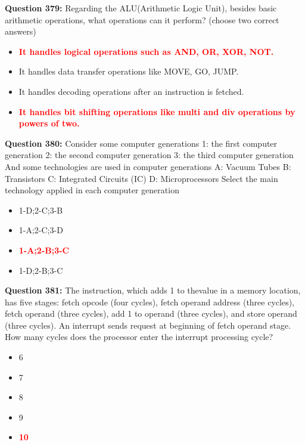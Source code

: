 \documentclass[12pt,a4paper]{article}
\begin{document}
\vspace{0.5cm}

\textbf{Question 379:} Regarding the ALU(Arithmetic Logic Unit), besides basic arithmetic operations, what operations can it perform? (choose two correct answers)

\begin{itemize}
    \item[\textbf{A.}] \textcolor{red}{\textbf{It handles logical operations such as AND, OR, XOR, NOT.}}
    \item[\textbf{B.}] It handles data transfer operations like MOVE, GO, JUMP.
    \item[\textbf{C.}] It handles decoding operations after an instruction is fetched.
    \item[\textbf{D.}] \textcolor{red}{\textbf{It handles bit shifting operations like multi and div operations by powers of two.}}
\end{itemize}

\vspace{0.5cm}

\textbf{Question 380:} Consider some computer generations 1: the first computer generation 2: the second computer generation 3: the third computer generation And some technologies are used in computer generations A: Vacuum Tubes B: Transistors C: Integrated Circuits (IC) D: Microprocessors Select the main technology applied in each computer generation

\begin{itemize}
    \item[\textbf{A.}] 1-D;2-C;3-B
    \item[\textbf{B.}] 1-A;2-C;3-D
    \item[\textbf{C.}] \textcolor{red}{\textbf{1-A;2-B;3-C}}
    \item[\textbf{D.}] 1-D;2-B;3-C
\end{itemize}

\vspace{0.5cm}

\textbf{Question 381:} The instruction, which adds 1 to thevalue in a memory location, has five stages: fetch opcode (four cycles), fetch operand address (three cycles), fetch operand (three cycles), add 1 to operand (three cycles), and store operand (three cycles). An interrupt sends request at beginning of fetch operand stage. How many cycles does the processor enter the interrupt processing cycle?

\begin{itemize}
    \item[\textbf{A.}] 6
    \item[\textbf{B.}] 7
    \item[\textbf{C.}] 8
    \item[\textbf{D.}] 9
    \item[\textbf{E.}] \textcolor{red}{\textbf{10}}
\end{itemize}
\end{document}
